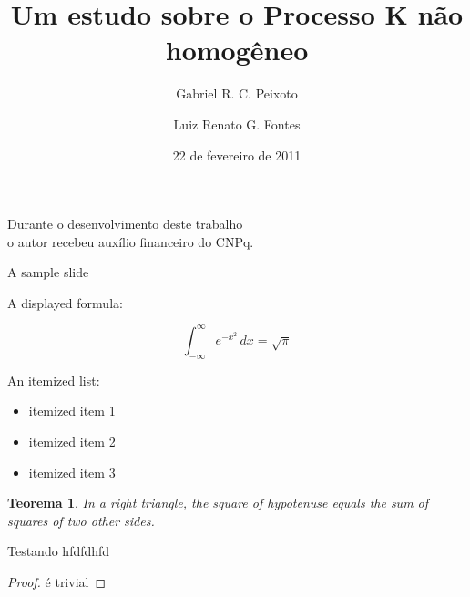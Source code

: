 \documentclass[xcolor=pdftex,dvipsnames]{beamer}
\title{Um estudo sobre o Processo K não homogêneo}
\author{Gabriel R. C. Peixoto \and Luiz Renato G. Fontes}
\date{22 de fevereiro de 2011}
\newtheorem{teorema}{Teorema}
\begin{document}
\begin{frame}[plain]
  \titlepage
  
  \begin{center}
    Durante o desenvolvimento deste trabalho \\
    o autor recebeu auxílio
    financeiro do CNPq.
  \end{center}
\end{frame}

\begin{frame}{A sample slide}



A displayed formula:

\[
  \int_{-\infty}^\infty e^{-x^2} \, dx = \sqrt{\pi}
\]
\pause

An itemized list:

\begin{itemize}
  \item itemized item 1 
  \item itemized item 2 
  \item itemized item 3
\end{itemize}

\begin{teorema}
  In a right triangle, the square of hypotenuse equals the sum of
  squares of two other sides.
\end{teorema}

\end{frame}

\begin{frame}[t]{Testando}
hfdfdhfd
\begin{proof}
é trivial
\end{proof}
\end{frame}
\end{document}
